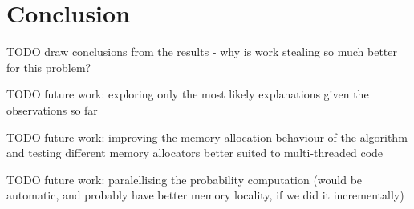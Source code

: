 \chapter{Conclusion}

TODO draw conclusions from the results - why is work stealing so much better for this problem?

TODO future work: exploring only the most likely explanations given the observations so far

TODO future work: improving the memory allocation behaviour of the algorithm and testing different memory allocators better suited to multi-threaded code

TODO future work: paralellising the probability computation (would be automatic, and probably have better memory locality, if we did it incrementally)
  